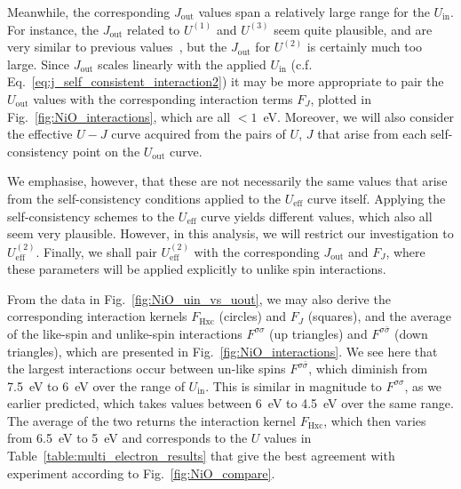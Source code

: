 Meanwhile, 
the corresponding $J_\textrm{out}$ values 
span a relatively large range 
for the $U_\textrm{in}$. 
%
For instance, 
the $J_\textrm{out}$ related 
to $U^{(1)}$ and $U^{(3)}$ seem quite plausible, 
and are very similar to previous values~\cite{PhysRevB.44.943,PhysRevB.60.10763,PhysRevLett.102.226401,PhysRevB.62.16392}, 
but the $J_\textrm{out}$ for $U^{(2)}$ 
is certainly much too large.
%
Since $J_\textrm{out}$ scales linearly 
with the applied $U_\textrm{in}$ 
(c.f. Eq.~\eqref{eq:j_self_consistent_interaction2})
it may be more appropriate to pair the $U_\textrm{out}$ values 
with the corresponding interaction terms $F_J$, 
plotted in Fig.~\ref{fig:NiO_interactions}, 
which are all $<1$~eV.
%
Moreover, 
we will also consider the effective $U-J$ curve 
acquired from the pairs of $U$, $J$ that arise from 
each self-consistency point on the $U_\textrm{out}$ curve.

We emphasise, however,
 that these are not necessarily the same 
values that arise from the self-consistency conditions  
applied to the $U_\textrm{eff}$ curve itself.
%
Applying the self-consistency schemes 
to the $U_\textrm{eff}$ curve yields different values, 
which also all seem very plausible.
% 
However, in this analysis, we will 
restrict our investigation to  
$U^{(2)}_\textrm{eff}$.
%
Finally, 
we shall pair $U^{(2)}_\textrm{eff}$ 
with the corresponding $J_\textrm{out}$ and $F_J$, 
where these parameters will be applied 
explicitly to unlike spin interactions.


From the data in Fig.~\ref{fig:NiO_uin_vs_uout}, 
we may also derive the corresponding interaction kernels 
$F_\textrm{Hxc}$ (circles) and  $F_J$ (squares), 
and the average of the like-spin and unlike-spin interactions
$F^{\sigma\sigma}$ (up triangles) 
and $F^{\sigma\bar{\sigma}}$ (down triangles), 
which are presented in 
Fig.~\ref{fig:NiO_interactions}.
%
We see here that the largest interactions 
occur between un-like spins 
$F^{\sigma\bar{\sigma}}$, 
which diminish from 7.5~eV to 6~eV 
over the range of $U_\textrm{in}$.
% 
This is similar in magnitude to $F^{\sigma\sigma}$, 
as we earlier predicted, 
which takes values between 6~eV to 4.5~eV 
over the same range.
%
The average of the two returns 
the interaction kernel $F_\textrm{Hxc}$, 
which then varies from 6.5~eV to 5~eV 
and corresponds to the $U$ values 
in Table~\ref{table:multi_electron_results} 
that give the best agreement with experiment 
according to Fig.~\ref{fig:NiO_compare}.

